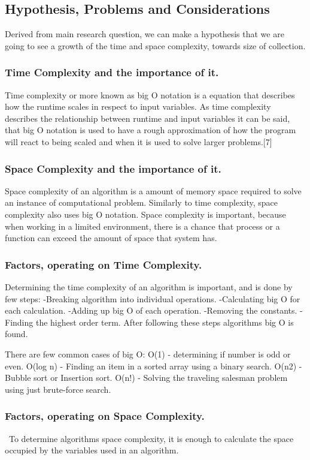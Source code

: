 \documentclass[]{report}
\begin{document}
\subsection{Hypothesis, Problems and Considerations}
Derived from main research question, we can make a hypothesis that we are going to see a growth of the time and space complexity, towards size of collection.
		\subsubsection{Time Complexity and the importance of it.}
		Time complexity or more known as big O notation is a equation that describes how the runtime scales in respect to input variables. As time complexity describes the relationship between runtime and input variables it can be said, that big O notation is used to have a rough approximation of how the program will react to being scaled and when it is used to solve larger problems.[7]
		\subsubsection{Space Complexity and the importance of it.}
		Space complexity of an algorithm is a amount of memory space required to solve an instance of computational problem. Similarly to time complexity, space complexity also uses big O notation. Space complexity is important, because when working in a limited environment, there is a chance that process or a function can exceed the amount of space that system has.
		\subsubsection{Factors, operating on Time Complexity.}
		Determining the time complexity of an algorithm is important, and is done by few steps:
			-Breaking algorithm into individual operations.
			-Calculating big O for each calculation.
			-Adding up big O of each operation.
			-Removing the constants.
			-Finding the highest order term.
		After following these steps algorithms big O is found.
		
		There are few common cases of big O:
		O(1) - determining if number is odd or even.
		O(log n) - Finding an item in a sorted array using a binary search.
		O(n2) - Bubble sort or Insertion sort.
		O(n!) - Solving the traveling salesman problem using just brute-force search.
		\subsubsection{Factors, operating on Space Complexity.}\
		To determine algorithms space complexity, it is enough to calculate the space occupied by the variables used in an algorithm.
		
\end{document}
